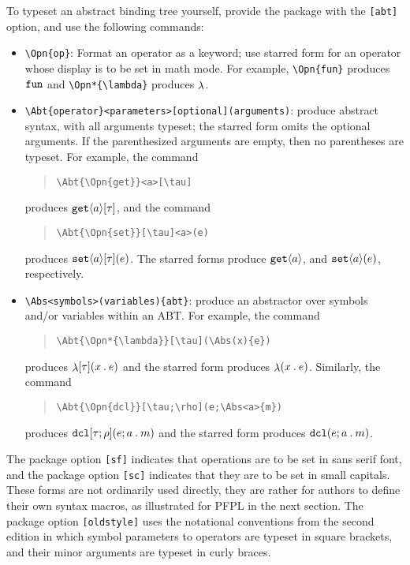 \documentclass[11pt]{article}
\begin{document}
To typeset an abstract binding tree yourself, provide the package with the \verb|[abt]| option, and use the following commands:
\begin{itemize}
  \item \verb|\Opn{op}|: Format an operator as a keyword; use starred form for an operator whose display is to be set in math mode.  For example, \verb|\Opn{fun}| produces $\Opn{fun}$ and \verb|\Opn*{\lambda}| produces $\Opn*{\lambda}$.
  \item \verb|\Abt{operator}<parameters>[optional](arguments)|: produce abstract syntax, with all arguments typeset; the starred form omits the optional arguments.  If the parenthesized arguments are empty, then no parentheses are typeset.  For example, the command
  \begin{quote}
\begin{verbatim}
\Abt{\Opn{get}}<a>[\tau]
\end{verbatim}
  \end{quote}
  produces $\Abt{\Opn{get}}<a>[\tau]$, and the command
  \begin{quote}
\begin{verbatim}
\Abt{\Opn{set}}[\tau]<a>(e)
\end{verbatim}
  \end{quote}
  produces $\Abt{\Opn{set}}<a>[\tau](e)$.  The starred forms produce $\Abt*{\Opn{get}}<a>[\tau]$, and $\Abt*{\Opn{set}}<a>[\tau](e)$, respectively.

  \item \verb|\Abs<symbols>(variables){abt}|: produce an abstractor over symbols and/or variables within an ABT.  For example, the command
  \begin{quote}
\begin{verbatim}
\Abt{\Opn*{\lambda}}[\tau](\Abs(x){e})
\end{verbatim}
  \end{quote}
  produces $\Abt{\Opn*{\lambda}}[\tau](\Abs(x){e})$ and the starred form produces $\Abt*{\Opn*{\lambda}}[\tau](\Abs(x){e})$.  Similarly, the command
  \begin{quote}
\begin{verbatim}
\Abt{\Opn{dcl}}[\tau;\rho](e;\Abs<a>{m})
\end{verbatim}
  \end{quote}
  produces $\Abt{\Opn{dcl}}[\tau;\rho](e;\Abs<a>{m})$ and the starred form produces $\Abt*{\Opn{dcl}}[\tau\,\rho](e;\Abs<a>{m})$.
\end{itemize}
The package option \verb|[sf]| indicates that operations are to be set in sans serif font, and the package option \verb|[sc]| indicates that they are to be set in small capitals.  These forms are not ordinarily used directly, they are rather for authors to define their own syntax macros, as illustrated for \textsf{PFPL} in the next section.  The package option \verb|[oldstyle]| uses the notational conventions from the second edition in which symbol parameters to operators are typeset in square brackets, and their minor arguments are typeset in curly braces.
\end{document}
